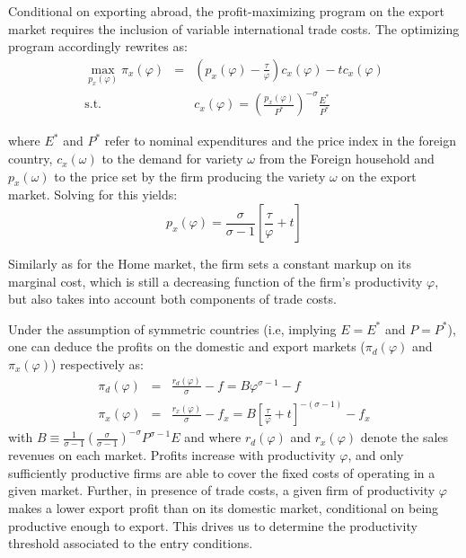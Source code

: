 \documentclass[a4paper,11pt]{article}
\begin{document}
Conditional on exporting abroad, the profit-maximizing program on the export market requires the inclusion of variable international trade costs. The optimizing program accordingly rewrites as:
\begin{eqnarray*}
\max_{p_x(\varphi)} \pi_x(\varphi) &=& \left(p_x(\varphi) -\frac{\tau}{\varphi}  \right)c_x(\varphi) - tc_x(\varphi) \\
\text{s.t. }&&c_x(\varphi) = \left(\frac{p_x(\varphi)}{P^\ast}  \right)^{-\sigma} \frac{E^\ast}{P^\ast}
\end{eqnarray*}

\noindent where $E^\ast$ and $P^\ast$ refer to nominal expenditures and the price index in the foreign country, $c_x(\omega)$ to the demand for variety $\omega$ from the Foreign household and $p_x(\omega)$ to the price set by the firm producing the variety $\omega$ on the export market. Solving for this yields:
\begin{equation}
p_x(\varphi) = \frac{\sigma}{\sigma-1}\left[\frac{\tau}{\varphi} +t \right] \label{eq:px}
\end{equation}

Similarly as for the Home market, the firm sets a constant markup on its marginal cost, which is still a decreasing function of the firm's productivity $\varphi$, but also takes into account both components of trade costs.

Under the assumption of symmetric countries (i.e, implying $E=E^\ast$ and $P=P^\ast$), one can deduce the profits on the domestic and export markets ($\pi_d(\varphi)$ and $\pi_x(\varphi)$) respectively as:
\begin{eqnarray}
\pi_d(\varphi)  &=& \frac{r_d(\varphi)}{\sigma} - f = B \varphi^{\sigma-1} - f \label{eq:pid_rd}\\
\pi_x(\varphi) &=& \frac{r_x(\varphi)}{\sigma} - f_x = B \left[ \frac{\tau}{\varphi} + t\right]^{-(\sigma-1)} - f_x \label{eq:pix_rx}
\end{eqnarray}
\noindent with $B \equiv \frac{1}{\sigma-1}\left(\frac{\sigma}{\sigma-1}\right)^{-\sigma}P^{\sigma-1}E$ and where $r_d(\varphi)$ and $r_x(\varphi)$ denote the sales revenues on each market. Profits increase with productivity $\varphi$, and only sufficiently productive firms are able to cover the fixed costs of operating in a given market. Further, in presence of trade costs, a given firm of productivity $\varphi$ makes a lower export profit than on its domestic market, conditional on being productive enough to export. This drives us to determine the productivity threshold associated to the entry conditions.
\end{document}

